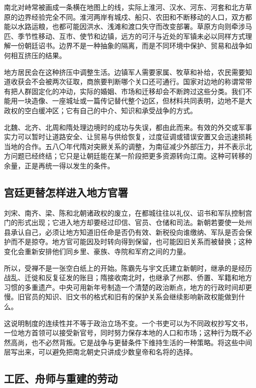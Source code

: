 南北对峙常被画成一条横在地图上的线，实际上淮河、汉水、河东、河套和北方草原的边界经验完全不同。淮河两岸有城戍、船只、农田和不断移动的人口，双方都能以水路运粮，也都可能因洪水、浅滩和渡口失守而改变部署。草原方向则牵涉马匹、季节性移动、互市、使节和边镇，远方的可汗与近处的军镇未必以同样方式理解一份朝廷诏书。边界不是一种抽象的隔离，而是不同环境中保护、贸易和战争如何相互挤压的结果。

地方居民会在这种挤压中调整生活。边镇军人需要家属、牧草和补给，农民需要知道收获会不会被两次征取，商旅要判断哪个关口还可通行。国家对边地的称谓常带有把人群固定化的冲动，实际的婚姻、市场和迁移却会不断跨过这些分类。我们不能用一块造像、一座城址或一篇传记替代整个边区，但材料共同表明，边地不是大政权的空白缓冲区；它有自己的中介、知识和承受战争的方式。

北魏、北齐、北周和隋处理边境时的成功与失误，都由此而来。有效的外交或军事实力可以暂时让道路安全、让贸易与供给恢复，过度征调或错误安置又会迅速损耗当地的合作。五八〇年代隋对突厥关系的调整，为南征减少外部压力，并不表示北方问题已经终结；它只是让朝廷能在某一阶段把更多资源转向江南。这种可转移的余量，正是再统一得以发生的条件。

\subsection{宫廷更替怎样进入地方官署}

刘宋、南齐、梁、陈和北朝诸政权的废立，在都城往往以礼仪、诏书和军队控制宫门的形式出现；它进入地方却要经过印信、官员、仓储和司法。新朝若要使一处州县承认自己，必须让地方知道旧任命是否仍有效、新税役向谁缴纳、军队是否会保护而不是掠夺。地方官可能因及时转向得到保留，也可能因旧关系而被替换；这种变化会重新安排他们同乡里、豪族、寺院和军府之间的力量。

所以，受禅不是一张空白纸上的开始。陈霸先与宇文氏建立新朝时，继承的是经历战乱、迁徙和反复征发的账目；隋接收南北时，也继承了州郡、侨置、军籍和地方习惯的多重遗产。中央可用新年号制造一个清楚的政治断点，地方的行政时间却更慢。旧官员的知识、旧文书的格式和旧有的保护关系会继续影响新政权能做到什么。

这说明制度的连续性并不等于政治立场不变。一个书吏可以为不同政权抄写文书，一位地方首领可以接受新官号，同时努力保存本地的人口和市场；这种行为既不必然高尚，也不必然背叛。它是战争与更替条件下维持生活的一种策略。将这些中间层写出来，可以避免把南北朝史只讲成少数皇帝和名将的选择。

\subsection{工匠、舟师与重建的劳动}

